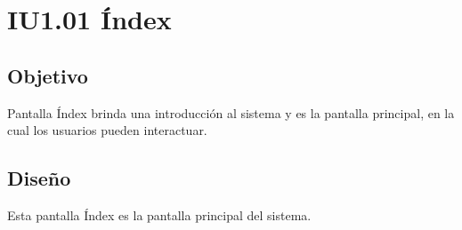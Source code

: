 
\newpage
\section{IU1.01 Índex}

\subsection{Objetivo}
	Pantalla Índex brinda una introducción al sistema y es la pantalla principal, en la cual los usuarios pueden interactuar.

\subsection{Diseño}
	Esta pantalla Índex es la pantalla principal del sistema.

